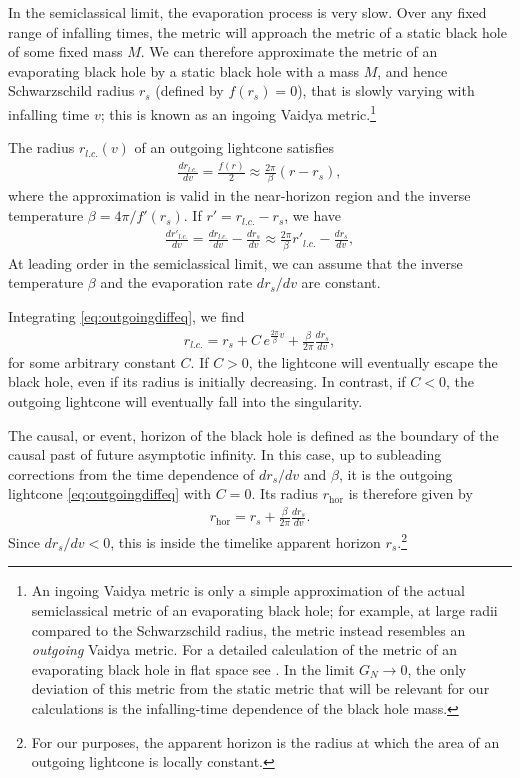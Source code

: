 \documentclass[11pt,a4paper]{article}
\begin{document}
In the semiclassical limit, the evaporation process is very slow. Over any fixed range of infalling times, the metric will approach the metric of a static black hole of some fixed mass $M$. We can therefore approximate the metric of an evaporating black hole by a static black hole with a mass $M$, and hence Schwarzschild radius $r_s$ (defined by $f(r_s) = 0$), that is slowly varying with infalling time $v$; this is known as an ingoing Vaidya metric.\footnote{An ingoing Vaidya metric is only a simple approximation of the actual semiclassical metric of an evaporating black hole; for example, at large radii compared to the Schwarzschild radius, the metric instead resembles an \emph{outgoing} Vaidya metric. For a detailed calculation of the metric of an evaporating black hole in flat space see \cite{abdolrahimi2016ingoing}. In the limit $G_N \to 0$, the only deviation of this metric from the static metric that will be relevant for our calculations is the infalling-time dependence of the black hole mass.}

The radius $r_{l.c.}(v)$ of an outgoing lightcone satisfies
\begin{align} \label{eq:outgoinglc}
\frac{dr_{l.c.}}{dv} = \frac{f(r)}{2} \approx \frac{2\pi}{\beta} (r - r_s),
\end{align}
where the approximation is valid in the near-horizon region and the inverse temperature $\beta = 4 \pi / f'(r_s)$. If $r' = r_{l.c.} - r_s$, we have
\begin{align} \label{eq:outgoingdiffeq}
\frac{dr'_{l.c.}}{dv} = \frac{dr_{l.c.}}{dv} - \frac{d r_s}{d v} \approx \frac{2\pi}{\beta} r'_{l.c.} - \frac{d r_s}{d v},
\end{align}
At leading order in the semiclassical limit, we can assume that the inverse temperature $\beta$ and the evaporation rate $d r_s / d v$ are constant.

Integrating \eqref{eq:outgoingdiffeq}, we find
\begin{align} \label{eq:arbitraryoutgoinglc}
r_{l.c.} = r_s + C \,e^{\frac{2\pi}{\beta}v} + \frac{\beta}{2 \pi} \frac{d r_s}{d v},
\end{align}
for some arbitrary constant $C$. If $C>0$, the lightcone will eventually escape the black hole, even if its radius is initially decreasing. In contrast, if $C<0$, the outgoing lightcone will eventually fall into the singularity.

The causal, or event, horizon of the black hole is defined as the boundary of the causal past of future asymptotic infinity. In this case, up to subleading corrections from the time dependence of $dr_s/dv$ and $\beta$, it is the outgoing lightcone \eqref{eq:outgoingdiffeq} with $C=0$. Its radius $r_\text{hor}$ is therefore given by
\begin{align} \label{eq:rhor}
r_\text{hor} = r_s + \frac{\beta}{2 \pi} \frac{d r_s}{d v}.
\end{align}
Since $d r_s/d v < 0$, this is inside the timelike apparent horizon $r_s$.\footnote{For our purposes, the apparent horizon is the radius at which the area of an outgoing lightcone is locally constant.}
\end{document}
